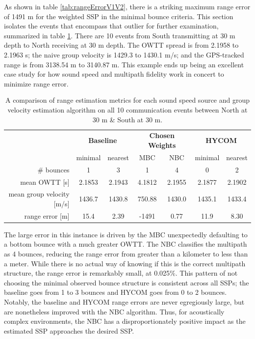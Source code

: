 As shown in table \ref{tab:rangeErrorV1V2}, there is a striking maximum range error of 1491 m for the weighted SSP in the minimal bounce criteria.
This section isolates the events that encompass that outlier for further examination, summarized in table \ref{tab:rangeErrorPostExplanation}.
There are 10 events from South transmitting at 30 m depth to North receiving at 30 m depth.
The OWTT spread is from 2.1958 to 2.1963 s; the naive group velocity is 1429.3 to 1430.1 m/s; and the GPS-tracked range is from 3138.54 m to 3140.87 m.
This example ends up being an excellent case study for how sound speed and multipath fidelity work in concert to minimize range error.

\begin{table}[h!]
\renewcommand{\arraystretch}{1.5}
\centering
\begin{tabular}{r|cc|cc|cc}\toprule
 & \multicolumn{2}{c|}{\textbf{Baseline} } & \multicolumn{2}{c|}{\textbf{Chosen Weights} } & \multicolumn{2}{c}{\textbf{HYCOM}} \\
  & \cellcolor[HTML]{EFEFEF}minimal & nearest & \cellcolor[HTML]{EFEFEF} MBC& NBC & \cellcolor[HTML]{EFEFEF}minimal & nearest \\ \hline
 \# bounces 				& \cellcolor[HTML]{EFEFEF}1 		& 3 		& \cellcolor[HTML]{EFEFEF}1 		& 4 		& \cellcolor[HTML]{EFEFEF}0 	 & 2 \\
 mean OWTT [s] 				& \cellcolor[HTML]{EFEFEF}2.1853 	& 2.1943 	& \cellcolor[HTML]{EFEFEF}4.1812 	& 2.1955 	& \cellcolor[HTML]{EFEFEF}2.1877 & 2.1902 \\
 mean group velocity [m/s] 	& \cellcolor[HTML]{EFEFEF}1436.7 	& 1430.8 	& \cellcolor[HTML]{EFEFEF}750.88 	& 1430.0 	& \cellcolor[HTML]{EFEFEF}1435.1 & 1433.4 \\
 range error [m] 			& \cellcolor[HTML]{EFEFEF}15.4 		& 2.39 	 	& \cellcolor[HTML]{EFEFEF}-1491 	& 0.77 		& \cellcolor[HTML]{EFEFEF}11.9 & 8.30 \\
 \toprule
\end{tabular}
\caption[Further look at algorithm differences for one beacon to beacon pairing]{A comparison of range estimation metrics for each sound speed source and group velocity estimation algorithm on all 10 communication events between North at 30 m \& South at 30 m.}
\label{tab:rangeErrorPostExplanation}
\end{table}

The large error in this instance is driven by the MBC unexpectedly defaulting to a bottom bounce with a much greater OWTT.
The NBC classifies the multipath as 4 bounces, reducing the range error from greater than a kilometer to less than a meter.
While there is no actual way of knowing if this is the correct multipath structure, the range error is remarkably small, at 0.025\%. 
This pattern of not choosing the minimal observed bounce structure is consistent across all SSPs; the baseline goes from 1 to 3 bounces and HYCOM goes from 0 to 2 bounces.
Notably, the baseline and HYCOM range errors are never egregiously large, but are nonetheless improved with the NBC algorithm.
Thus, for acoustically complex environments, the NBC has a disproportionately positive impact as the estimated SSP approaches the desired SSP.

